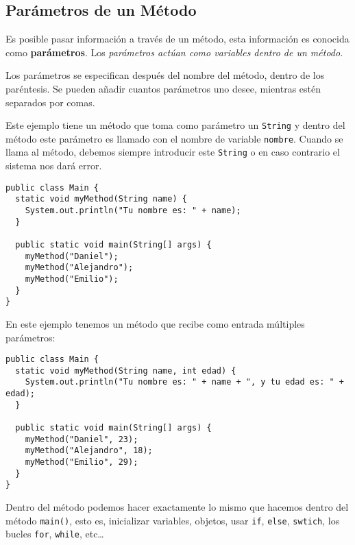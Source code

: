 \documentclass[12pt]{article}
\theoremstyle{largebreak}
\begin{document}
    \subsection{Parámetros de un Método}

    Es posible pasar información a través de un método, esta información es conocida como \textbf{parámetros}. Los \textit{parámetros actúan como variables dentro de un método}.

    Los parámetros se especifican después del nombre del método, dentro de los paréntesis. Se pueden añadir cuantos parámetros uno desee, mientras estén separados por comas.

    \begin{exa}
        Este ejemplo tiene un método que toma como parámetro un \lstinline|String| y dentro del método este parámetro es llamado con el nombre de variable \lstinline|nombre|. Cuando se llama al método, debemos siempre introducir este \lstinline|String| o en caso contrario el sistema nos dará error.
        \begin{lstlisting}[caption={Parámetro en un Método.},label=DescriptiveLabel]
public class Main {
  static void myMethod(String name) {
    System.out.println("Tu nombre es: " + name);
  }

  public static void main(String[] args) {
    myMethod("Daniel");
    myMethod("Alejandro");
    myMethod("Emilio");
  }
}
        \end{lstlisting}
    \end{exa}

    \begin{exa}
        En este ejemplo tenemos un método que recibe como entrada múltiples parámetros:
        \begin{lstlisting}[caption={Método con Múltiples Parámetros.},label=DescriptiveLabel]
public class Main {
  static void myMethod(String name, int edad) {
    System.out.println("Tu nombre es: " + name + ", y tu edad es: " + edad);
  }

  public static void main(String[] args) {
    myMethod("Daniel", 23);
    myMethod("Alejandro", 18);
    myMethod("Emilio", 29);
  }
}
        \end{lstlisting}
    \end{exa}

    \begin{obs}
        Dentro del método podemos hacer exactamente lo mismo que hacemos dentro del método \lstinline|main()|, esto es, inicializar variables, objetos, usar \lstinline|if|, \lstinline|else|, \lstinline|swtich|, los bucles \lstinline|for|, \lstinline|while|, etc\dots
    \end{obs}
\end{document}
